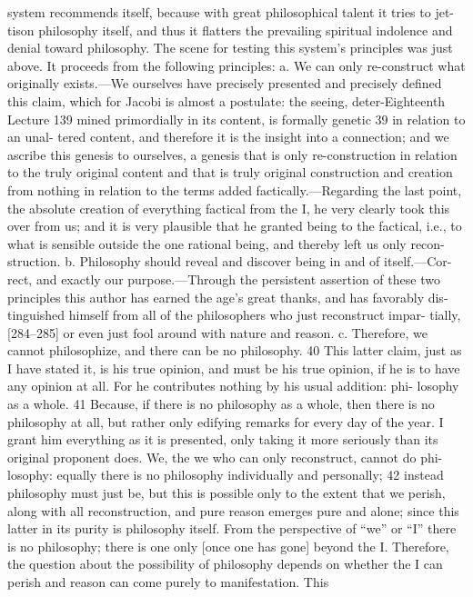 system recommends itself, because with great philosophical talent it tries to jet-
tison philosophy itself, and thus it flatters the prevailing spiritual indolence and
denial toward philosophy. The scene for testing this system’s principles was just
above. It proceeds from the following principles: a. We can only re-construct
what originally exists.—We ourselves have precisely presented and precisely
defined this claim, which for Jacobi is almost a postulate: the seeing, deter-Eighteenth Lecture
139
mined primordially in its content, is formally genetic 39 in relation to an unal-
tered content, and therefore it is the insight into a connection; and we ascribe
this genesis to ourselves, a genesis that is only re-construction in relation to the
truly original content and that is truly original construction and creation from
nothing in relation to the terms added factically.—Regarding the last point, the
absolute creation of everything factical from the I, he very clearly took this over
from us; and it is very plausible that he granted being to the factical, i.e., to
what is sensible outside the one rational being, and thereby left us only recon-
struction. b. Philosophy should reveal and discover being in and of itself.—Cor-
rect, and exactly our purpose.—Through the persistent assertion of these two
principles this author has earned the age’s great thanks, and has favorably dis-
tinguished himself from all of the philosophers who just reconstruct impar-
tially, [284–285] or even just fool around with nature and reason. c. Therefore,
we cannot philosophize, and there can be no philosophy. 40 This latter claim, just
as I have stated it, is his true opinion, and must be his true opinion, if he is to
have any opinion at all. For he contributes nothing by his usual addition: phi-
losophy as a whole. 41 Because, if there is no philosophy as a whole, then there is
no philosophy at all, but rather only edifying remarks for every day of the year.
I grant him everything as it is presented, only taking it more seriously than its
original proponent does. We, the we who can only reconstruct, cannot do phi-
losophy: equally there is no philosophy individually and personally; 42 instead
philosophy must just be, but this is possible only to the extent that we perish,
along with all reconstruction, and pure reason emerges pure and alone; since
this latter in its purity is philosophy itself. From the perspective of “we” or “I”
there is no philosophy; there is one only [once one has gone] beyond the I.
Therefore, the question about the possibility of philosophy depends on
whether the I can perish and reason can come purely to manifestation. This

